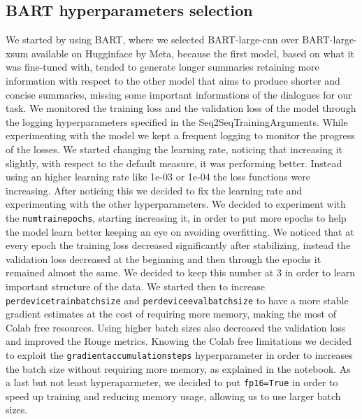 \documentclass[10pt,twocolumn,letterpaper]{article}
\begin{document}
\subsection{BART hyperparameters selection}
We started by using BART, where we selected BART-large-cnn over BART-large-xsum available on Hugginface by Meta, because the first model, based on what it was fine-tuned with, tended to generate longer summaries retaining more information with respect to the other model that aims to produce shorter and concise summaries, missing some important informations of the dialogues for our task.
We monitored the training loss and the validation loss of the model through the logging hyperparameters specified in the Seq2SeqTrainingArguments. While experimenting with the model we kept a frequent logging to monitor the progress of the losses. 
We started changing the learning rate, noticing that increasing it slightly, with respect to the default measure, it was performing better. Instead using an higher learning rate like 1e-03 or 1e-04 the loss functions were increasing. After noticing this we decided to fix the learning rate and experimenting with the other hyperparameters. 
We decided to experiment with the \texttt{num\textunderscore train\textunderscore epochs}, starting increasing it, in order to put more epochs to help the model learn 
better keeping an eye on avoiding overfitting. We noticed that at every epoch the training loss decreased significantly after stabilizing, instead the validation loss 
decreased at the beginning and then through the epochs it remained almost the same. We decided to keep this number at 3 in order to learn important structure of the data.
We started then to increase \texttt{per\textunderscore device\textunderscore train\textunderscore batch\textunderscore size} and 
\texttt{per\textunderscore device\textunderscore eval\textunderscore batch\textunderscore size} to have a more stable gradient estimates at the 
cost of requiring more memory, making the most of Colab free resources. Using higher batch sizes also decreased the validation loss and improved the Rouge metrics. 
Knowing the Colab free limitations we decided to exploit the \texttt{gradient\textunderscore accumulation\textunderscore steps} hyperparameter in order to increases the batch 
size without requiring more memory, as explained in the notebook.
As a last but not least hyperaparmeter, we decided to put \texttt{fp16=True} in order to speed up training and reducing memory usage, allowing us to use larger batch sizes.
\end{document}

